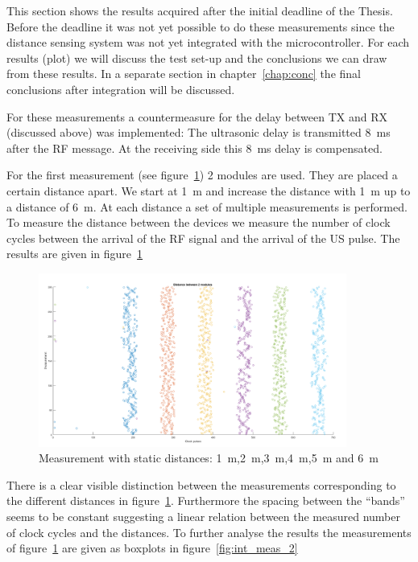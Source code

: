 This section shows the results acquired after the initial deadline of the Thesis.
Before the deadline it was not yet possible to do these measurements since the distance sensing system was not yet integrated with the microcontroller.
For each results (plot) we will discuss the test set-up and the conclusions we can draw from these results.
In a separate section in chapter~\ref{chap:conc} the final conclusions after integration will be discussed.

For these measurements a countermeasure for the delay between TX and RX (discussed above) was implemented:
The ultrasonic delay is transmitted \SI{8}{\milli\second} after the RF message.
At the receiving side this \SI{8}{\milli\second} delay is compensated.

For the first measurement (see figure~\ref{fig:int_meas_1}) 2 modules are used.
They are placed a certain distance apart.
We start at \SI{1}{\meter} and increase the distance with \SI{1}{\meter} up to a distance of \SI{6}{\meter}.
At each distance a set of multiple measurements is performed.
To measure the distance between the devices we measure the number of clock cycles between the arrival of the RF signal and the arrival of the US pulse.
The results are given in figure~\ref{fig:int_meas_1}

\begin{figure}[H]
\centering
\includegraphics[width=0.9\textwidth]{Figures/Distance_6.png}
\caption{Measurement with static distances: \SI{1}{\meter},\SI{2}{\meter},\SI{3}{\meter},\SI{4}{\meter},\SI{5}{\meter} and \SI{6}{\meter}}
\label{fig:int_meas_1}
\end{figure}

There is a clear visible distinction between the measurements corresponding to the different distances in figure~\ref{fig:int_meas_1}.
Furthermore the spacing between the ``bands'' seems to be constant suggesting a linear relation between the measured number of clock cycles and the distances.
To further analyse the results the measurements of figure~\ref{fig:int_meas_1} are given as boxplots in figure~\ref{fig:int_meas_2}

